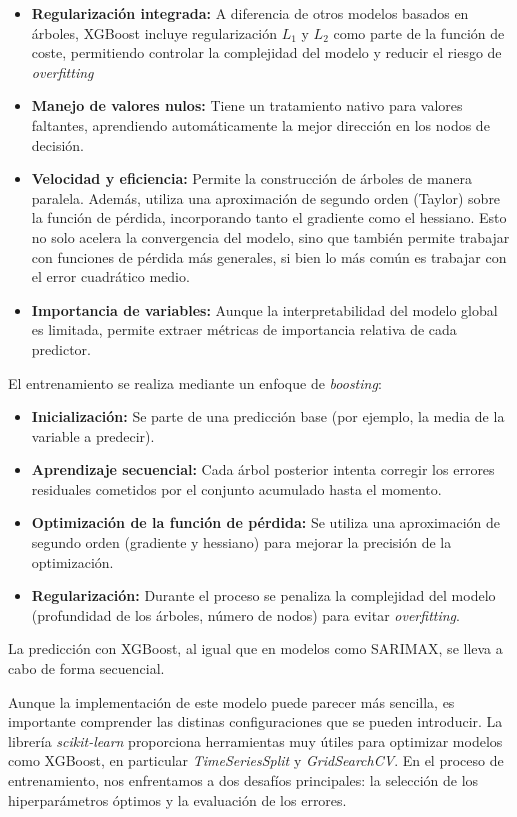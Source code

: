 \begin{itemize}
    \item \textbf{Regularización integrada:} A diferencia de otros modelos basados en árboles, XGBoost incluye regularización $L_1$ y $L_2$ como parte de la función de coste, permitiendo controlar la complejidad del modelo y reducir el riesgo de \textit{overfitting}
    \item \textbf{Manejo de valores nulos:} Tiene un tratamiento nativo para valores faltantes, aprendiendo automáticamente la mejor dirección en los nodos de decisión.
    \item \textbf{Velocidad y eficiencia:} Permite la construcción de árboles de manera paralela. Además, utiliza una aproximación de segundo orden (Taylor) sobre la función de pérdida, incorporando tanto el gradiente como el hessiano. Esto no solo acelera la convergencia del modelo, sino que también permite trabajar con funciones de pérdida más generales, si bien lo más común es trabajar con el error cuadrático medio.
    \item \textbf{Importancia de variables:} Aunque la interpretabilidad del modelo global es limitada, permite extraer métricas de importancia relativa de cada predictor.
\end{itemize}

El entrenamiento se realiza mediante un enfoque de \textit{boosting}:

\begin{itemize}
    \item \textbf{Inicialización:} Se parte de una predicción base (por ejemplo, la media de la variable a predecir).
    \item \textbf{Aprendizaje secuencial:} Cada árbol posterior intenta corregir los errores residuales cometidos por el conjunto acumulado hasta el momento.
    \item \textbf{Optimización de la función de pérdida:} Se utiliza una aproximación de segundo orden (gradiente y hessiano) para mejorar la precisión de la optimización.
    \item \textbf{Regularización:} Durante el proceso se penaliza la complejidad del modelo (profundidad de los árboles, número de nodos) para evitar \textit{overfitting}.
\end{itemize}
La predicción con XGBoost, al igual que en modelos como SARIMAX, se lleva a cabo de forma secuencial.

Aunque la implementación de este modelo puede parecer más sencilla, es importante comprender las distinas configuraciones que se pueden introducir. La librería \textit{scikit-learn} proporciona herramientas muy útiles para optimizar modelos como XGBoost, en particular \textit{TimeSeriesSplit} y \textit{GridSearchCV}. En el proceso de entrenamiento, nos enfrentamos a dos desafíos principales: la selección de los hiperparámetros óptimos y la evaluación de los errores.

